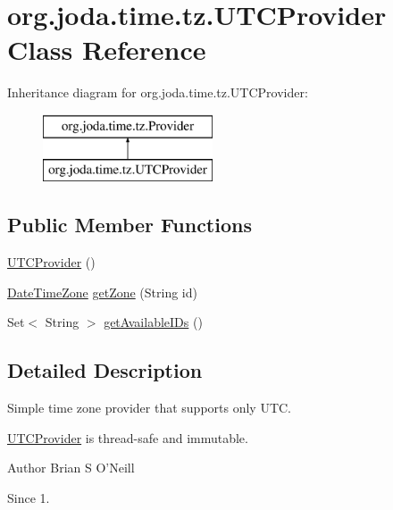 \hypertarget{classorg_1_1joda_1_1time_1_1tz_1_1_u_t_c_provider}{\section{org.\-joda.\-time.\-tz.\-U\-T\-C\-Provider Class Reference}
\label{classorg_1_1joda_1_1time_1_1tz_1_1_u_t_c_provider}
}
Inheritance diagram for org.\-joda.\-time.\-tz.\-U\-T\-C\-Provider\-:\begin{figure}[H]
\begin{center}
\leavevmode
\includegraphics[height=2.000000cm]{classorg_1_1joda_1_1time_1_1tz_1_1_u_t_c_provider}
\end{center}
\end{figure}
\subsection*{Public Member Functions}
\begin{DoxyCompactItemize}
\item 
\hyperlink{classorg_1_1joda_1_1time_1_1tz_1_1_u_t_c_provider_af1b2e386e7c57537a53b5e698767625b}{U\-T\-C\-Provider} ()
\item 
\hyperlink{classorg_1_1joda_1_1time_1_1_date_time_zone}{Date\-Time\-Zone} \hyperlink{classorg_1_1joda_1_1time_1_1tz_1_1_u_t_c_provider_a1a43542a28fa0542ba54047a796e7e43}{get\-Zone} (String id)
\item 
Set$<$ String $>$ \hyperlink{classorg_1_1joda_1_1time_1_1tz_1_1_u_t_c_provider_a2007f05429e016d4fc9ad2810aebdaad}{get\-Available\-I\-Ds} ()
\end{DoxyCompactItemize}


\subsection{Detailed Description}
Simple time zone provider that supports only U\-T\-C. 

\hyperlink{classorg_1_1joda_1_1time_1_1tz_1_1_u_t_c_provider}{U\-T\-C\-Provider} is thread-\/safe and immutable.

\begin{DoxyAuthor}{Author}
Brian S O'Neill 
\end{DoxyAuthor}
\begin{DoxySince}{Since}
1. 
\end{DoxySince}


